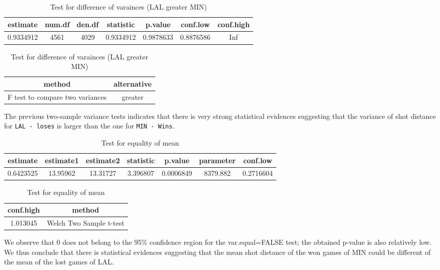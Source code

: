 \documentclass[
  11pt,
]{article}
\begin{document}
\begin{table}[H]
\caption{\label{tab:first-var-test2}Test for difference of varainces (LAL greater MIN)}

\centering
\begin{tabular}[t]{ccccccc}
\toprule
estimate & num.df & den.df & statistic & p.value & conf.low & conf.high\\
\midrule
0.9334912 & 4561 & 4029 & 0.9334912 & 0.9878633 & 0.8876586 & Inf\\
\bottomrule
\end{tabular}
\centering
\begin{tabular}[t]{cc}
\toprule
method & alternative\\
\midrule
F test to compare two variances & greater\\
\bottomrule
\end{tabular}
\end{table}

The previous two-sample variance tests indicates that there is very strong statistical evidences suggesting that the variance of shot distance for \texttt{LAL\ -\ loses} is larger than the one for \texttt{MIN\ -\ Wins}.

\begin{table}[H]
\caption{\label{tab:first-var-test3}Test for equality of mean}

\centering
\begin{tabular}[t]{ccccccc}
\toprule
estimate & estimate1 & estimate2 & statistic & p.value & parameter & conf.low\\
\midrule
0.6423525 & 13.95962 & 13.31727 & 3.396807 & 0.0006849 & 8379.882 & 0.2716604\\
\bottomrule
\end{tabular}
\centering
\begin{tabular}[t]{cc}
\toprule
conf.high & method\\
\midrule
1.013045 & Welch Two Sample t-test\\
\bottomrule
\end{tabular}
\end{table}

We observe that 0 does not belong to the 95\% confidence region for the var.equal=FALSE test; the obtained p-value is also relatively low. We thus conclude that there is statistical evidences suggesting that the mean shot distance of the won games of MIN could be different of the mean of the lost games of LAL.
\end{document}
